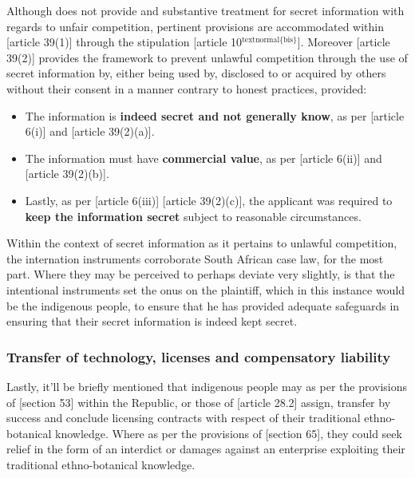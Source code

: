 \documentclass[11pt]{article}
\begin{document}
Although \cite{wipo83_paris_conve_protect_ip} does not provide and substantive
treatment for secret information with regards to unfair competition, pertinent
provisions are accommodated within [article 39(1)]\cite{wto17_trips} through the
stipulation [article 10\(^{\text{textnormal\{bis\}}}\)]\cite{wipo83_paris_conve_protect_ip}.
Moreover [article 39(2)]\cite{wto17_trips} provides the framework to prevent
unlawful competition through the use of secret information by, either being used
by, disclosed to or acquired by others without their consent in a manner
contrary to honest practices, provided:
\begin{itemize}
\item The information is \textbf{indeed secret and not generally know}, as per [article
6(i)]\cite{wipo96_model_provi_unfair_comp} and [article
39(2)(a)]\cite{wto17_trips}.
\item The information must have \textbf{commercial value}, as per [article
6(ii)]\cite{wipo96_model_provi_unfair_comp} and [article
39(2)(b)]\cite{wto17_trips}.
\item Lastly, as per [article 6(iii)]\cite{wipo96_model_provi_unfair_comp} [article
39(2)(c)]\cite{wto17_trips}, the applicant was required to \textbf{keep the information
secret} subject to reasonable circumstances.
\end{itemize}

Within the context of secret information as it pertains to unlawful competition,
the internation instruments corroborate South African case law, for the most
part. Where they may be perceived to perhaps deviate very slightly, is that the
intentional instruments set the onus on the plaintiff, which in this instance
would be the indigenous people, to ensure that he has provided adequate
safeguards in ensuring that their secret information is indeed kept secret.

\subsubsection{Transfer of technology, licenses  and compensatory liability}
\label{sec:org531a7f0}

Lastly, it'll be briefly mentioned that indigenous people may as per the
provisions of [section 53]\cite{rsa78_patents_act} within the Republic, or those
of [article 28.2]\cite{wto17_trips} assign, transfer by success and conclude
licensing contracts with respect of their traditional ethno-botanical knowledge.
Where as per the provisions of [section 65]\cite{rsa78_patents_act}, they could
seek relief in the form of an interdict or damages against an enterprise
exploiting their traditional ethno-botanical knowledge.

\printbibliography
\end{document}
